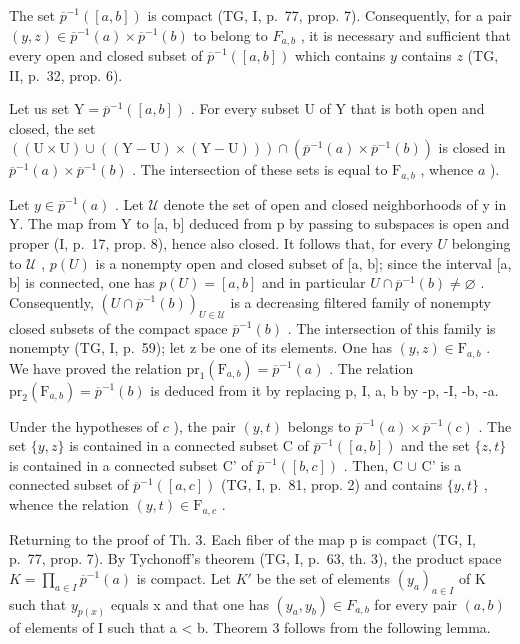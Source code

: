 The set \(\overline{p}^{-1}([a,b])\) is compact (TG, I, p.~77, prop. 7). Consequently, for a pair \((y,z)\in\overline{p}^{-1}(a)\times\overline{p}^{-1}(b)\) to belong to \(F_{a,b}\) , it is necessary and sufficient that every open and closed subset of \(\overline{p}^{-1}([a,b])\) which contains \(y\) contains \(z\) (TG, II, p.~32, prop. 6).

Let us set \(\mathrm{Y} = \overline{p}^{-1}([a,b])\) . For every subset U of Y that is both open and closed, the set \(((\mathrm{U} \times \mathrm{U}) \cup ((\mathrm{Y} - \mathrm{U}) \times (\mathrm{Y} - \mathrm{U}))) \cap (\overline{p}^{-1}(a) \times \overline{p}^{-1}(b))\) is closed in \(\overline{p}^{-1}(a) \times \overline{p}^{-1}(b)\) . The intersection of these sets is equal to \(\mathrm{F}_{a,b}\) , whence \(a\) ).

Let \(y \in \overline{p}^{-1}(a)\) . Let \(\mathcal{U}\) denote the set of open and closed neighborhoods of y in Y. The map from Y to {[}a, b{]} deduced from p by passing to subspaces is open and proper (I, p.~17, prop. 8), hence also closed. It follows that, for every \(U\) belonging to \(\mathcal{U}\) , \(p(U)\) is a nonempty open and closed subset of {[}a, b{]}; since the interval {[}a, b{]} is connected, one has \(p(U) = [a, b]\) and in particular \(U \cap \overline{p}^{-1}(b) \neq \varnothing\) . Consequently, \((U \cap \overline{p}^{-1}(b))_{U \in \mathcal{U}}\) is a decreasing filtered family of nonempty closed subsets of the compact space \(\overline{p}^{-1}(b)\) . The intersection of this family is nonempty (TG, I, p.~59); let z be one of its elements. One has \((y, z) \in \mathrm{F}_{a,b}\) . We have proved the relation \(\mathrm{pr}_{1}(\mathrm{F}_{a,b}) = \overline{p}^{-1}(a)\) . The relation \(\mathrm{pr}_{2}(\mathrm{F}_{a,b}) = \overline{p}^{-1}(b)\) is deduced from it by replacing p, I, a, b by -p, -I, -b, -a.

Under the hypotheses of \(c\) ), the pair \((y,t)\) belongs to \(\overline{p}^{-1}(a)\times\overline{p}^{-1}(c)\) . The set \(\{y,z\}\) is contained in a connected subset C of \(\overline{p}^{-1}([a,b])\) and the set \(\{z,t\}\) is contained in a connected subset C' of \(\overline{p}^{-1}([b,c])\) . Then, C \(\cup\) C' is a connected subset of \(\overline{p}^{-1}([a,c])\) (TG, I, p.~81, prop. 2) and contains \(\{y,t\}\) , whence the relation \((y,t)\in\mathrm{F}_{a,c}\) .

Returning to the proof of Th. 3. Each fiber of the map p is compact (TG, I, p.~77, prop. 7). By Tychonoff's theorem (TG, I, p.~63, th. 3), the product space \(K = \prod_{a \in I} \overline{p}^{-1}(a)\) is compact. Let \(K'\) be the set of elements \((y_{a})_{a \in I}\) of K such that \(y_{p(x)}\) equals x and that one has \((y_{a}, y_{b}) \in F_{a,b}\) for every pair \((a, b)\) of elements of I such that a \textless{} b. Theorem 3 follows from the following lemma.

